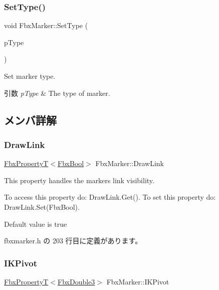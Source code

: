 \subsubsection{\texorpdfstring{Set\+Type()}{SetType()}}
{\footnotesize\ttfamily void Fbx\+Marker\+::\+Set\+Type (\begin{DoxyParamCaption}\item[{\hyperlink{class_fbx_marker_ad1e38753dce9a2212df0364466d9f617}{E\+Type}}]{p\+Type }\end{DoxyParamCaption})}

Set marker type. 
\begin{DoxyParams}{引数}
{\em p\+Type} & The type of marker. \\
\hline
\end{DoxyParams}


\subsection{メンバ詳解}
\mbox{\label{class_fbx_marker_a7ad25f4f97b2e7ac7effeb6e9dc63e4f}} 
\subsubsection{\texorpdfstring{Draw\+Link}{DrawLink}}
{\footnotesize\ttfamily \hyperlink{class_fbx_property_t}{Fbx\+PropertyT}$<$\hyperlink{fbxtypes_8h_a92e0562b2fe33e76a242f498b362262e}{Fbx\+Bool}$>$ Fbx\+Marker\+::\+Draw\+Link}

This property handles the marker\textquotesingle{}s link visibility.

To access this property do\+: Draw\+Link.\+Get(). To set this property do\+: Draw\+Link.\+Set(\+Fbx\+Bool).

Default value is true 

 fbxmarker.\+h の 203 行目に定義があります。

\mbox{\label{class_fbx_marker_a5bd3a4b16e95b47ea5d391941cb6f00c}} 
\subsubsection{\texorpdfstring{I\+K\+Pivot}{IKPivot}}
{\footnotesize\ttfamily \hyperlink{class_fbx_property_t}{Fbx\+PropertyT}$<$\hyperlink{fbxtypes_8h_ae0a96f14cde566774c7553aa7523b7a7}{Fbx\+Double3}$>$ Fbx\+Marker\+::\+I\+K\+Pivot}

